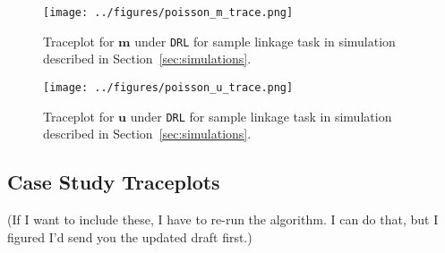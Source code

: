 \documentclass[12pt,letterpaper]{article}
\newcommand{\1}[1]{\mathbb{I}\!\left[#1\right]} %
\def \brian#1{{\color{red} (#1)}}
\begin{document}
\begin{figure}[t]
	\centering
	\texttt{[image: ../figures/poisson\_m\_trace.png]}
	\caption{Traceplot for $\bm{m}$ under \texttt{DRL} for sample linkage task in simulation described in Section~\ref{sec:simulations}.}
	\label{fig:m-traceplot}
\end{figure}

\begin{figure}[t]
	\centering
	\texttt{[image: ../figures/poisson\_u\_trace.png]}
	\caption{Traceplot for $\bm{u}$ under \texttt{DRL} for sample linkage task in simulation described in Section~\ref{sec:simulations}.}
	\label{fig:u-traceplot}
\end{figure}

\subsection{Case Study Traceplots}

\brian{If I want to include these, I have to re-run the algorithm. I can do that, but I figured I'd send you the updated draft first.}
\end{document}
